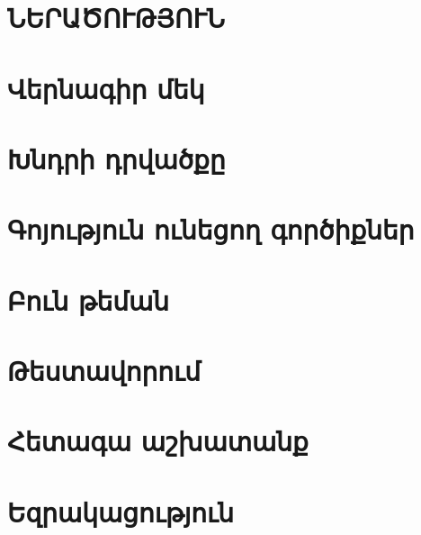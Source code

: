 \documentclass[a4paper, 12pt]{report}
\renewcommand{\bibname}{Գրականություն} %
\begin{document}
    

    \setcounter{page}{2}

    

    

    \newpage
    \begin{center}
        \tableofcontents
    \end{center}

    \clearpage

    \section*{\textbf{ՆԵՐԱԾՈՒԹՅՈՒՆ}}
    


    \section{Վերնագիր մեկ}
    

	\section{Խնդրի դրվածքը}
	
		
	\section{Գոյություն ունեցող գործիքներ}
	
			
	\section{Բուն թեման}
	
		
	\section{Թեստավորում}
	
			
	\section{Հետագա աշխատանք}
	
	
    \clearpage
    \section*{Եզրակացություն}
    


    
    


    \clearpage
\end{document}
